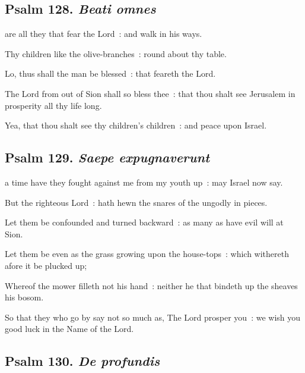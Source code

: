 \subsection{Psalm 128. \textit{Beati omnes}}

 are all they that fear the Lord~: and walk in his ways.\par
{}
Thy children like the olive-branches~: round about thy table.\par
{}Lo, thus shall the man be blessed~: that feareth the Lord.\par
{}The Lord from out of Sion shall so bless thee~: that thou shalt see Jerusalem in prosperity all thy life long.\par
{}Yea, that thou shalt see thy children's children~: and peace upon Israel.\par

\subsection{Psalm 129. \textit{Saepe expugnaverunt}}

 a time have they fought against me from my youth up~: may Israel now say.\par
{}
But the righteous Lord~: hath hewn the snares of the ungodly in pieces.\par
{}Let them be confounded and turned backward~: as many as have evil will at Sion.\par
{}Let them be even as the grass growing upon the house-tops~: which withereth afore it be plucked up;\par
{}Whereof the mower filleth not his hand~: neither he that bindeth up the sheaves his bosom.\par
{}So that they who go by say not so much as, The Lord prosper you~: we wish you good luck in the Name of the Lord.\par

\subsection{Psalm 130. \textit{De profundis}}

